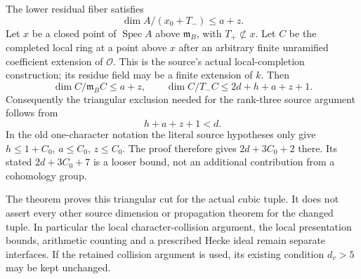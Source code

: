 \begin{theorem}
\label{thm:ACG98dimension}
The lower residual fiber satisfies
\[
 \dim A/(x_0+T_-)\le a+z.                         \tag{G98.6}
\]
Let $x$ be a closed point of $\operatorname{Spec}A$ above
$\mathfrak m_B$, with $T_+\not\subset x$.
Let $C$ be the completed local ring at a point above $x$ after
an arbitrary finite unramified coefficient extension of
$\mathcal O$.  This is the source's actual local-completion
construction; its residue field may be a finite extension of $k$.
Then
\[
 \dim C/\mathfrak m_BC\le a+z,\qquad
 \dim C/T_-C\le 2d+h+a+z+1.                     \tag{G98.7}
\]
Consequently the triangular exclusion needed for the rank-three
source argument follows from
\[
                         h+a+z+1<d.             \tag{G98.8}
\]
In the old one-character notation the literal source hypotheses
only give $h\le1+C_0$, $a\le C_0$, $z\le C_0$.
The proof therefore gives $2d+3C_0+2$ there.  Its stated
$2d+3C_0+7$ is a looser bound, not an additional contribution
from a cohomology group.

The theorem proves this triangular cut for the actual cubic
tuple.  It does not assert every other source dimension or
propagation theorem for the changed tuple.  In particular the
local character-collision argument, the local presentation
bounds, arithmetic counting and a prescribed Hecke ideal remain
separate interfaces.  If the retained collision argument is used,
its existing condition $d_v>5$ may be kept unchanged.
\end{theorem}

